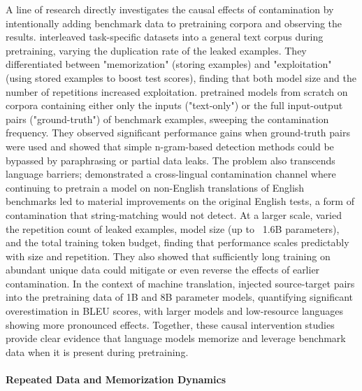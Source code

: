 A line of research directly investigates the causal effects of contamination by intentionally adding benchmark data to pretraining corpora and observing the results. \citet{magar2022data} interleaved task-specific datasets into a general text corpus during pretraining, varying the duplication rate of the leaked examples. They differentiated between "memorization" (storing examples) and "exploitation" (using stored examples to boost test scores), finding that both model size and the number of repetitions increased exploitation. \citet{jiang2024investigatingdatacontaminationpretraining} pretrained models from scratch on corpora containing either only the inputs ("text-only") or the full input-output pairs ("ground-truth") of benchmark examples, sweeping the contamination frequency. They observed significant performance gains when ground-truth pairs were used and showed that simple n-gram-based detection methods could be bypassed by paraphrasing or partial data leaks. The problem also transcends language barriers; \citet{yao2024data} demonstrated a cross-lingual contamination channel where continuing to pretrain a model on non-English translations of English benchmarks led to material improvements on the original English tests, a form of contamination that string-matching would not detect. At a larger scale, \citet{bordt2025howmuch} varied the repetition count of leaked examples, model size (up to ~1.6B parameters), and the total training token budget, finding that performance scales predictably with size and repetition. They also showed that sufficiently long training on abundant unique data could mitigate or even reverse the effects of earlier contamination. In the context of machine translation, \citet{kocyigit2025overestimation} injected source-target pairs into the pretraining data of 1B and 8B parameter models, quantifying significant overestimation in BLEU scores, with larger models and low-resource languages showing more pronounced effects. Together, these causal intervention studies provide clear evidence that language models memorize and leverage benchmark data when it is present during pretraining.

\paragraph{Repeated Data and Memorization Dynamics}

